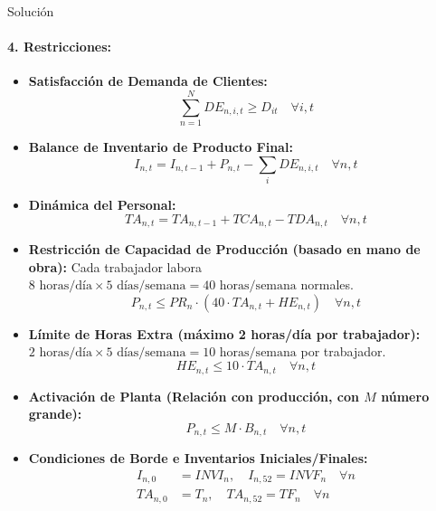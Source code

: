 \documentclass[11pt, a4paper]{article}
\begin{document}
\begin{ejercicio}{Solución}
  \paragraph{4. Restricciones:}
  \begin{itemize}
    \item \textbf{Satisfacción de Demanda de Clientes:}
    \begin{equation}
      \sum_{n=1}^{N} DE_{n,i,t} \ge D_{it} \quad \forall i, t
    \end{equation}
    \item \textbf{Balance de Inventario de Producto Final:}
    \begin{equation}
      I_{n,t} = I_{n,t-1} + P_{n,t} - \sum_{i} DE_{n,i,t} \quad \forall n, t
    \end{equation}
    \item \textbf{Dinámica del Personal:}
    \begin{equation}
      TA_{n,t} = TA_{n,t-1} + TCA_{n,t} - TDA_{n,t} \quad \forall n, t
    \end{equation}
    \item \textbf{Restricción de Capacidad de Producción (basado en mano de obra):}
    Cada trabajador labora $8 \text{ horas/día} \times 5 \text{ días/semana} = 40 \text{ horas/semana}$ normales.
    \begin{equation}
      P_{n,t} \le PR_n \cdot \left( 40 \cdot TA_{n,t} + HE_{n,t} \right) \quad \forall n, t
    \end{equation}
    \item \textbf{Límite de Horas Extra (máximo 2 horas/día por trabajador):}
    $2 \text{ horas/día} \times 5 \text{ días/semana} = 10 \text{ horas/semana}$ por trabajador.
    \begin{equation}
      HE_{n,t} \le 10 \cdot TA_{n,t} \quad \forall n, t
    \end{equation}
    \item \textbf{Activación de Planta (Relación con producción, con $M$ número grande):}
    \begin{equation}
      P_{n,t} \le M \cdot B_{n,t} \quad \forall n, t
    \end{equation}
    \item \textbf{Condiciones de Borde e Inventarios Iniciales/Finales:}
    \begin{align}
      I_{n,0} &= INVI_n, \quad I_{n,52} = INVF_n \quad \forall n \\
      TA_{n,0} &= T_n, \quad TA_{n,52} = TF_n \quad \forall n
    \end{align}
  \end{itemize}


\end{ejercicio}
\end{document}
